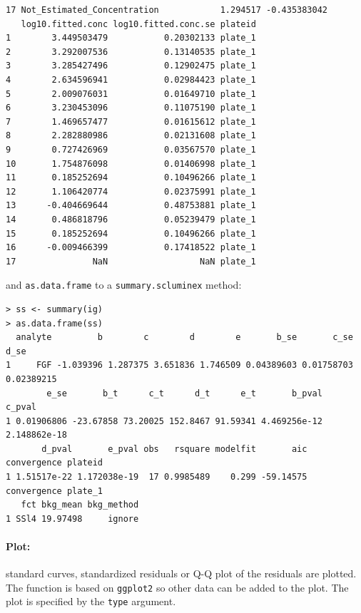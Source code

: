 \documentclass[11pt]{article}\usepackage[]{graphicx}\usepackage[]{color}
\makeatletter
\newenvironment{kframe}{%
 \def\at@end@of@kframe{}%
 \ifinner\ifhmode%
  \def\at@end@of@kframe{\end{minipage}}%
  \begin{minipage}{\columnwidth}%
 \fi\fi%
 \def\FrameCommand##1{\hskip\@totalleftmargin \hskip-\fboxsep
 \colorbox{shadecolor}{##1}\hskip-\fboxsep
     \hskip-\linewidth \hskip-\@totalleftmargin \hskip\columnwidth}%
 \MakeFramed {\advance\hsize-\width
   \@totalleftmargin\z@ \linewidth\hsize
   \@setminipage}}%
 {\par\unskip\endMakeFramed%
 \at@end@of@kframe}
\newenvironment{knitrout}{}{} %
\makeatother
\begin{document}
\begin{knitrout}
\begin{kframe}
\begin{verbatim}
17 Not_Estimated_Concentration            1.294517 -0.435383042
   log10.fitted.conc log10.fitted.conc.se plateid
1        3.449503479           0.20302133 plate_1
2        3.292007536           0.13140535 plate_1
3        3.285427496           0.12902475 plate_1
4        2.634596941           0.02984423 plate_1
5        2.009076031           0.01649710 plate_1
6        3.230453096           0.11075190 plate_1
7        1.469657477           0.01615612 plate_1
8        2.282880986           0.02131608 plate_1
9        0.727426969           0.03567570 plate_1
10       1.754876098           0.01406998 plate_1
11       0.185252694           0.10496266 plate_1
12       1.106420774           0.02375991 plate_1
13      -0.404669644           0.48753881 plate_1
14       0.486818796           0.05239479 plate_1
15       0.185252694           0.10496266 plate_1
16      -0.009466399           0.17418522 plate_1
17               NaN                  NaN plate_1
\end{verbatim}
\end{kframe}
\end{knitrout}



\noindent and {\tt as.data.frame} to a {\tt summary.scluminex} method:
\begin{knitrout}
\color{fgcolor}\begin{kframe}
\begin{verbatim}
> ss <- summary(ig)
> as.data.frame(ss)
  analyte         b        c        d        e       b_se       c_se       d_se
1     FGF -1.039396 1.287375 3.651836 1.746509 0.04389603 0.01758703 0.02389215
        e_se       b_t      c_t      d_t      e_t       b_pval       c_pval
1 0.01906806 -23.67858 73.20025 152.8467 91.59341 4.469256e-12 2.148862e-18
       d_pval       e_pval obs   rsquare modelfit       aic convergence plateid
1 1.51517e-22 1.172038e-19  17 0.9985489    0.299 -59.14575 convergence plate_1
   fct bkg_mean bkg_method
1 SSl4 19.97498     ignore
\end{verbatim}
\end{kframe}
\end{knitrout}

\newpage
\paragraph{Plot:} standard curves, standardized residuals or 
Q-Q plot of the residuals are plotted. The function is based on 
{\tt ggplot2} so other data can be added to the plot. The plot 
is specified by the {\tt type} argument.\\
\end{document}
